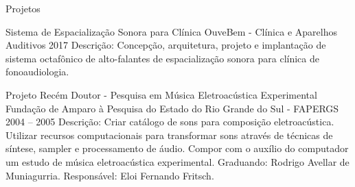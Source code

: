 \documentclass[10pt,a4paper]{altacv}
\begin{document}
\medskip

\cvsection
{Projetos}

\cvevent
{Sistema de Espacialização Sonora para Clínica}
{OuveBem - Clínica e Aparelhos Auditivos}
{2017}{}
Descrição: Concepção, arquitetura, projeto e implantação de sistema octafônico de alto-falantes de espacialização sonora para clínica de fonoaudiologia.

\divider

\cvevent
{Projeto Recém Doutor - Pesquisa em Música Eletroacústica Experimental}
{Fundação de Amparo à Pesquisa do Estado do Rio Grande do Sul - FAPERGS}
{2004 -- 2005}{}
Descrição: Criar catálogo de sons para composição eletroacústica. Utilizar recursos computacionais para transformar sons através de técnicas de síntese, sampler e processamento de áudio. Compor com o auxílio do computador um estudo de música eletroacústica experimental. Graduando: Rodrigo Avellar de Muniagurria. Responsável: Eloi Fernando Fritsch.

\medskip



{}
\nocite{*}
% 
% 
\printbibliography[heading=pubtype,title={\printinfo{\faFileTextO}{Artigos}},type=article]

\divider

\printbibliography[heading=pubtype,title={\printinfo{\faGroup}{Participação em Congressos e Palestras}},type=inproceedings]

\end{document}
